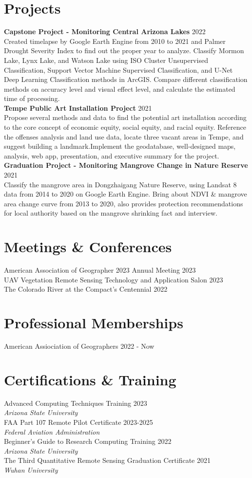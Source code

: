\documentclass[11pt,a4paper]{article}
\newcommand{\proj}[3]{\noindent\textbf{#1} \hfill #2\\ \hfill #3 \vspace{7 pt}\\}
\newcommand{\conf}[2]{#1 \hfill #2 \vspace{7 pt}\\}
\newcommand{\train}[4]{#1 \hfill #2\\ \emph{#3} \hfill #4 \vspace{7 pt}\\}
\begin{document}
\section{Projects}
\proj{Capstone Project - Monitoring Central Arizona Lakes}{2022}{Created timelapse by Google Earth Engine from 2010 to 2021 and Palmer Drought Severity Index to find out the
proper year to analyze. Classify Mormon Lake, Lynx Lake, and Watson Lake using ISO Cluster Unsupervised Classification, Support Vector Machine Supervised Classification, and U-Net Deep Learning Classification methods in ArcGIS. Compare different classification methods on accuracy level and visual effect level, and calculate the estimated time of processing.}
\proj{Tempe Public Art Installation Project}{2021}{Propose several methods and data to find the potential art installation according to the core concept of economic
equity, social equity, and racial equity. Reference the offenses analysis and land use data, locate three vacant areas in Tempe, and suggest building a landmark.Implement the geodatabase, well-designed maps, analysis, web app, presentation, and executive summary for the project.}
\proj{Graduation Project - Monitoring Mangrove Change in Nature Reserve}{2021}{Classify the mangrove area in Dongzhaigang Nature Reserve, using Landsat 8 data from 2014 to 2020 on Google Earth Engine. Bring about NDVI \& mangrove area change curve from 2013 to 2020, also provides protection recommendations for local authority based on the mangrove shrinking fact and interview.}

\section{Meetings \& Conferences}
\conf{American Association of Geographer 2023 Annual Meeting}{2023}
\conf{UAV Vegetation Remote Sensing Technology and Application Salon}{2023}
\conf{The Colorado River at the Compact's Centennial}{2022}


\section{Professional Memberships}
\conf{American Assiociation of Geographers}{2022 - Now}
\section{Certifications \& Training}
\train{Advanced Computing Techniques Training}{2023}{Arizona State University}{}
\train{FAA Part 107 Remote Pilot Certificate}{2023-2025}{Federal Aviation Administration}{}
\train{Beginner's Guide to Research Computing Training}{2022}{Arizona State University}{}
\train{The Third Quantitative Remote Sensing Graduation Certificate}{2021}{Wuhan University}{}
\end{document}
